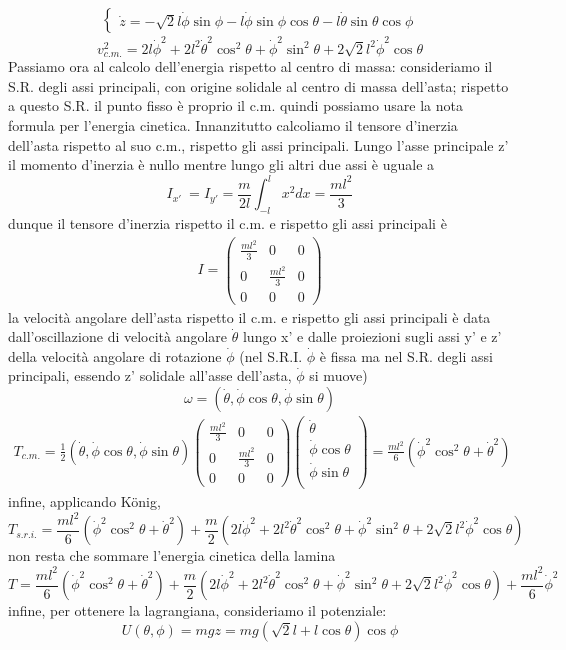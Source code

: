\documentclass[
10pt, %
a4paper, %
oneside, %
headinclude,footinclude, %
BCOR5mm, %
]{scrartcl}
\begin{document}
\begin{esercizio}
\begin{align*}
\begin{cases}
			\dot{z} =  -\sqrt{2}l\dot{\phi}\sin\phi-l\dot{\phi}\sin\phi\cos\theta-l\dot{\theta}\sin\theta\cos\phi
		\end{cases}
	\end{align*}
	\[v_{c.m.}^2 = 2 l \dot{\phi}^2+ 2 l^2\dot{\theta}^2\cos^2\theta + \dot{\phi}^2\sin^2\theta+2\sqrt{2}l^2\dot{\phi}^2\cos\theta \]
	Passiamo ora al calcolo dell'energia rispetto al centro di massa: consideriamo il S.R. degli assi principali, con origine solidale al centro di massa dell'asta; rispetto a questo S.R. il punto fisso è proprio il c.m. quindi possiamo usare la nota formula per l'energia cinetica. Innanzitutto calcoliamo il tensore d'inerzia dell'asta rispetto al suo c.m., rispetto gli assi principali. Lungo l'asse principale z' il momento d'inerzia è nullo mentre lungo gli altri due assi è uguale a
	\[I_{x'}\ = I_{y'} = \frac{m}{2l}\int^{l}_{-l}x^2dx = \frac{ml^2}{3}\]
	dunque il tensore d'inerzia rispetto il c.m. e rispetto gli assi principali è
	\begin{align*}
		I = 
		\begin{pmatrix}
			\frac{ml^2}{3}&0&0\\
			0&\frac{ml^2}{3}&0\\
			0&0&0
		\end{pmatrix}
	\end{align*}
	la velocità angolare dell'asta rispetto il c.m. e rispetto gli assi principali è data dall'oscillazione di velocità angolare $\dot{\theta}$ lungo x' e dalle proiezioni sugli assi y' e z' della velocità angolare di rotazione $\dot{\phi}$ (nel S.R.I. $\dot{\phi}$ è fissa ma nel S.R. degli assi principali, essendo z' solidale all'asse dell'asta, $\dot{\phi}$ si muove)
	\[\omega = (\dot{\theta}, \dot{\phi}\cos\theta, \dot{\phi}\sin\theta)\]
		\begin{align*}
			T_{c.m.} = \frac{1}{2}
			( \dot{\theta},\dot{\phi}\cos\theta, \dot{\phi}\sin\theta)
		\begin{pmatrix}
			\frac{ml^2}{3}&0&0\\
			0&\frac{ml^2}{3}&0\\
			0&0&0
		\end{pmatrix}
	\begin{pmatrix}
		\dot{\theta}\\
		\dot{\phi}\cos\theta\\
		\dot{\phi}\sin\theta\\
	\end{pmatrix} = 
	\frac{ml^2}{6}\left(\dot{\phi}^2\cos^2\theta + \dot{\theta}^2\right)
	\end{align*}
infine, applicando K\"{o}nig, 
\[T_{s.r.i.} = \frac{ml^2}{6}\left(\dot{\phi}^2\cos^2\theta + \dot{\theta}^2\right)+ \frac{m}{2}\left(2 l \dot{\phi}^2+ 2 l^2\dot{\theta}^2\cos^2\theta + \dot{\phi}^2\sin^2\theta+2\sqrt{2}l^2\dot{\phi}^2\cos\theta \right) \]
non resta che sommare l'energia cinetica della lamina
\[T = \frac{ml^2}{6}\left(\dot{\phi}^2\cos^2\theta + \dot{\theta}^2\right)+ \frac{m}{2}\left(2 l \dot{\phi}^2+ 2 l^2\dot{\theta}^2\cos^2\theta + \dot{\phi}^2\sin^2\theta+2\sqrt{2}l^2\dot{\phi}^2\cos\theta \right)+\frac{ml^2}{6}\dot{\phi}^2\]
infine, per ottenere la lagrangiana, consideriamo il potenziale:
\[U(\theta, \phi) = mgz = mg (\sqrt{2}l + l\cos\theta)\cos\phi\]


\end{esercizio}
\end{document}

